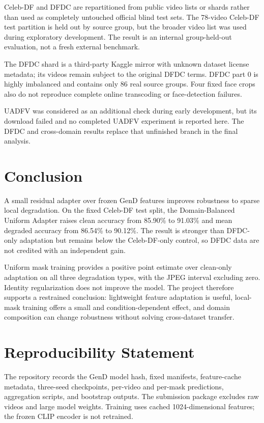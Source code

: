 \documentclass[10pt,twocolumn]{article}
\begin{document}
Celeb-DF and DFDC are repartitioned from public video lists or shards rather
than used as completely untouched official blind test sets. The 78-video
Celeb-DF test partition is held out by source group, but the broader video list
was used during exploratory development. The result is an internal
group-held-out evaluation, not a fresh external benchmark.

The DFDC shard is a third-party Kaggle mirror with unknown dataset license
metadata; its videos remain subject to the original DFDC terms. DFDC part 0 is
highly imbalanced and contains only 86 real source groups. Four fixed face
crops also do not reproduce complete online transcoding or face-detection
failures.

UADFV was considered as an additional check during early development, but its
download failed and no completed UADFV experiment is reported here. The DFDC
and cross-domain results replace that unfinished branch in the final analysis.

\section{Conclusion}

A small residual adapter over frozen GenD features improves robustness to
sparse local degradation. On the fixed Celeb-DF test split, the
Domain-Balanced Uniform Adapter raises clean accuracy from 85.90\% to 91.03\%
and mean degraded accuracy from 86.54\% to 90.12\%. The result is stronger
than DFDC-only adaptation but remains below the Celeb-DF-only control, so DFDC
data are not credited with an independent gain.

Uniform mask training provides a positive point estimate over clean-only
adaptation on all three degradation types, with the JPEG interval excluding
zero. Identity regularization does not improve the model. The project therefore
supports a restrained conclusion: lightweight feature adaptation is useful,
local-mask training offers a small and condition-dependent effect, and domain
composition can change robustness without solving cross-dataset transfer.

\section*{Reproducibility Statement}
The repository records the GenD model hash, fixed manifests, feature-cache
metadata, three-seed checkpoints, per-video and per-mask predictions,
aggregation scripts, and bootstrap outputs. The submission package excludes raw
videos and large model weights. Training uses cached 1024-dimensional features;
the frozen CLIP encoder is not retrained.
\end{document}

